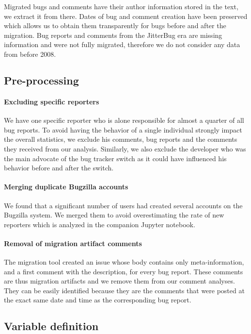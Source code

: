 \documentclass[conference]{IEEEtran}
\begin{document}
Migrated bugs and comments have their author information stored in the text, we extract it from there. Dates of bug and comment creation have been preserved which allows us to obtain them transparently for bugs before and after the migration. Bug reports and comments from the JitterBug era are missing information and were not fully migrated, therefore we do not consider any data from before 2008.

\subsection{Pre-processing}

\paragraph{Excluding specific reporters}
We have one specific reporter who is alone responsible for almost a quarter of all bug reports. To avoid having the behavior of a single individual strongly impact the overall statistics, we exclude his comments, bug reports and the comments they received from our analysis. Similarly, we also exclude the developer who was the main advocate of the bug tracker switch as it could have influenced his behavior before and after the switch.

\paragraph{Merging duplicate Bugzilla accounts}
We found that a significant number of users had created several accounts on the Bugzilla system. We merged them to avoid overestimating the rate of new reporters which is analyzed in the companion Jupyter notebook.

\paragraph{Removal of migration artifact comments}
The migration tool created an issue whose body contains only meta-information, and a first comment with the description, for every bug report. These comments are thus migration artifacts and we remove them from our comment analyses. They can be easily identified because they are the comments that were posted at the exact same date and time as the corresponding bug report.

\subsection{Variable definition}
\end{document}
